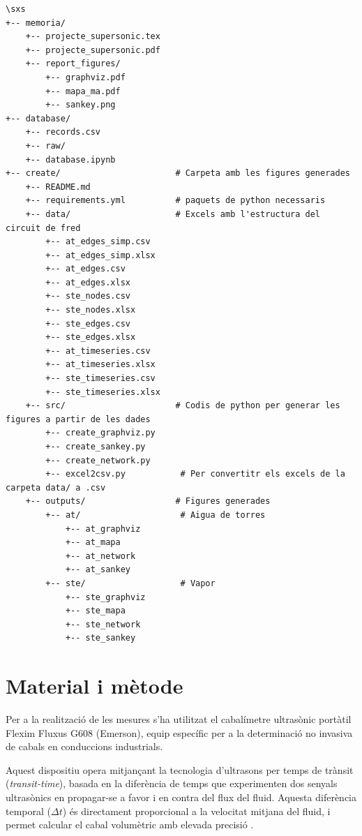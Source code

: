 \documentclass[11pt]{article}
\begin{document}
\begin{verbatim}
\sxs
+-- memoria/
    +-- projecte_supersonic.tex
    +-- projecte_supersonic.pdf
    +-- report_figures/
        +-- graphviz.pdf
        +-- mapa_ma.pdf
        +-- sankey.png
+-- database/
    +-- records.csv
    +-- raw/
    +-- database.ipynb
+-- create/                       # Carpeta amb les figures generades
    +-- README.md                  
    +-- requirements.yml          # paquets de python necessaris
    +-- data/                     # Excels amb l'estructura del circuit de fred
        +-- at_edges_simp.csv
        +-- at_edges_simp.xlsx
        +-- at_edges.csv
        +-- at_edges.xlsx
        +-- ste_nodes.csv
        +-- ste_nodes.xlsx
        +-- ste_edges.csv
        +-- ste_edges.xlsx
        +-- at_timeseries.csv
        +-- at_timeseries.xlsx
        +-- ste_timeseries.csv
        +-- ste_timeseries.xlsx
    +-- src/                      # Codis de python per generar les figures a partir de les dades
        +-- create_graphviz.py    
        +-- create_sankey.py     
        +-- create_network.py    
        +-- excel2csv.py           # Per convertitr els excels de la carpeta data/ a .csv
    +-- outputs/                  # Figures generades
        +-- at/                    # Aigua de torres
            +-- at_graphviz
            +-- at_mapa
            +-- at_network
            +-- at_sankey
        +-- ste/                   # Vapor
            +-- ste_graphviz
            +-- ste_mapa
            +-- ste_network
            +-- ste_sankey
\end{verbatim}

\section{Material i mètode}

Per a la realització de les mesures s'ha utilitzat el cabalímetre ultrasònic portàtil Flexim Fluxus G608 (Emerson), equip específic per a la determinació no invasiva de cabals en conduccions industrials.

Aquest dispositiu opera mitjançant la tecnologia d'ultrasons per temps de trànsit (\textit{transit-time}), basada en la diferència de temps que experimenten dos senyals ultrasònics en propagar-se a favor i en contra del flux del fluid. Aquesta diferència temporal ($\Delta t$) és directament proporcional a la velocitat mitjana del fluid, i permet calcular el cabal volumètric amb elevada precisió \cite{Emerson2024}.
\end{document}
